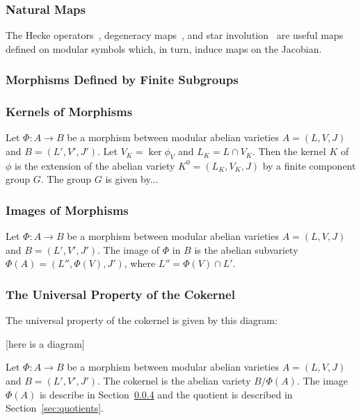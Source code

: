 \documentclass{article}
\begin{document}
\subsubsection{Natural Maps}

The Hecke operators~\cite[\S 8.3]{stein:modform}, degeneracy maps~\cite[\S
	8.6]{stein:modform}, and star involution~\cite[\S 8.5]{stein:modform} are
useful maps defined on modular symbols which, in turn, induce maps on the
Jacobian.

\subsubsection{Morphisms Defined by Finite Subgroups}

\subsubsection{Kernels of Morphisms}
\label{sec:kernelmodabvar}

Let $\Phi:A\to B$ be a morphism between modular abelian varieties $A=(L, V, J)$
and $B=(L', V', J')$. Let $V_K=\ker \phi_V$ and $L_K=L\cap V_K$. Then the
kernel $K$ of $\phi$ is the extension of the abelian variety $K^0 = (L_K, V_K,
	J)$ by a finite component group $G$. The group $G$ is given by...

\subsubsection{Images of Morphisms}
\label{sec:image}

Let $\Phi:A\to B$ be a morphism between modular abelian varieties $A=(L, V, J)$
and $B=(L', V', J')$. The image of $\Phi$ in $B$ is the abelian subvariety
$\Phi(A)=(L'', \Phi(V), J')$, where $L''=\Phi(V)\cap L'$.


\subsubsection{The Universal Property of the Cokernel}

The universal property of the cokernel is given by this diagram:

[here is a diagram]

Let $\Phi:A\to B$ be a morphism between modular abelian varieties $A=(L, V, J)$
and $B=(L', V', J')$. The cokernel is the abelian variety $B/\Phi(A)$. The
image $\Phi(A)$ is describe in Section~\ref{sec:image} and the quotient is
described in Section~\ref{sec:quotients}.
\end{document}
